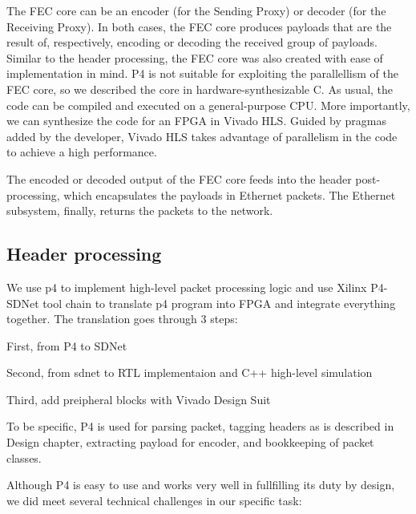 The FEC core can be an encoder (for the Sending Proxy) or decoder (for the
Receiving Proxy).  In both cases, the FEC core
produces payloads that are the result of, respectively, encoding or decoding
the received group of payloads.  Similar to the header processing, the FEC core
was also created with ease of implementation in mind.  P4 is not suitable
for
exploiting the parallellism of the FEC core, so we described the core in
hardware-synthesizable C.  As usual, the code can be compiled and executed on a
general-purpose CPU.  More importantly, we can synthesize the code for an FPGA
in Vivado HLS.  Guided by pragmas added by the developer, Vivado HLS takes
advantage of parallelism in the code to achieve a high performance.

The encoded or decoded output of the FEC core feeds into the header
post-processing, which encapsulates the payloads in Ethernet packets.  The
Ethernet subsystem, finally, returns the packets to the network.

\subsection{Header processing}

We use p4 to implement high-level packet processing logic and 
use Xilinx P4-SDNet tool chain to translate p4 program into FPGA and integrate everything together.
The translation goes through 3 steps:

First, from P4 to SDNet

Second, from sdnet to RTL implementaion and C++ high-level simulation

Third, add preipheral blocks with Vivado Design Suit

To be specific, P4 is used for parsing packet, tagging headers as is described in Design chapter,
extracting payload for encoder, and bookkeeping of packet classes.

Although P4 is easy to use and works very well in fullfilling its duty by design,
we did meet several technical challenges in our specific task:

